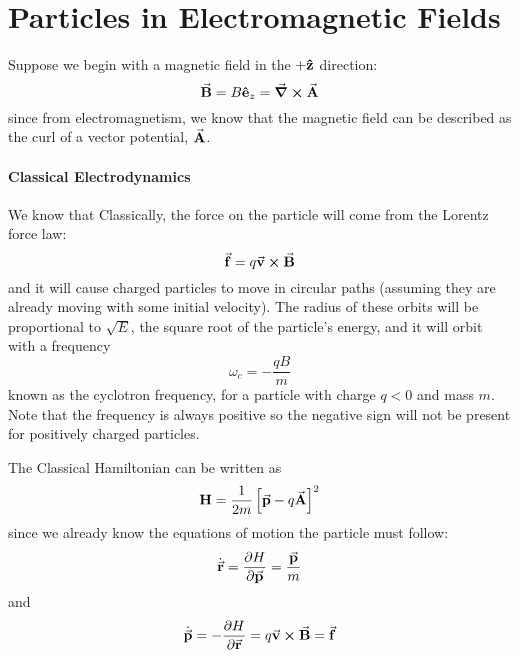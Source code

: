 \documentclass[a4paper,twoside,master.tex]{subfiles}
\begin{document}

\section{Particles in Electromagnetic Fields}
\label{sec:particles_in_electromagnetic_fields}

Suppose we begin with a magnetic field in the $ + \vu{z} $ direction:
\begin{equation}
    \va{B} = B \vu{e}_z = \curl{ \va{A}}
\end{equation}
since from electromagnetism, we know that the magnetic field can be described as the curl of a vector potential, $ \va{A} $.

\paragraph{Classical Electrodynamics}

We know that Classically, the force on the particle will come from the Lorentz force law:
\begin{equation}
    \va{f} = q \va{v} \cross \va{B}
\end{equation}
and it will cause charged particles to move in circular paths (assuming they are already moving with some initial velocity). The radius of these orbits will be proportional to $ \sqrt{E} $, the square root of the particle's energy, and it will orbit with a frequency
\begin{equation}
    \omega_c = - \frac{qB}{m}
\end{equation}
known as the cyclotron frequency, for a particle with charge $ q < 0 $ and mass $ m $. Note that the frequency is always positive so the negative sign will not be present for positively charged particles.

The Classical Hamiltonian can be written as
\begin{equation}
    \vb{H} = \frac{1}{2m} \left[ \va{p} - q \va{A} \right]^2
\end{equation}
since we already know the equations of motion the particle must follow:
\begin{equation}
    \dot{ \va{r}} = \pdv{H}{ \va{p}} = \frac{ \va{p}}{m}
\end{equation}
and
\begin{equation}
    \dot{ \va{p}} = - \pdv{H}{ \va{r}} = q \va{v} \cross \va{B} = \va{f}
\end{equation}
\end{document}
